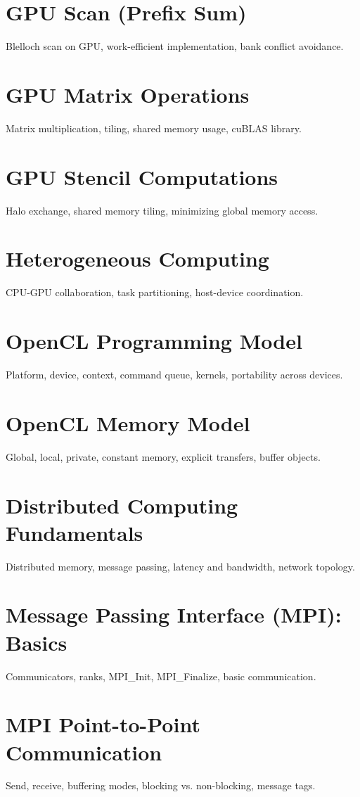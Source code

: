 \chapter{GPU Scan (Prefix Sum)}
Blelloch scan on GPU, work-efficient implementation, bank conflict avoidance.

\chapter{GPU Matrix Operations}
Matrix multiplication, tiling, shared memory usage, cuBLAS library.

\chapter{GPU Stencil Computations}
Halo exchange, shared memory tiling, minimizing global memory access.

\chapter{Heterogeneous Computing}
CPU-GPU collaboration, task partitioning, host-device coordination.

\chapter{OpenCL Programming Model}
Platform, device, context, command queue, kernels, portability across devices.

\chapter{OpenCL Memory Model}
Global, local, private, constant memory, explicit transfers, buffer objects.


\chapter{Distributed Computing Fundamentals}
Distributed memory, message passing, latency and bandwidth, network topology.

\chapter{Message Passing Interface (MPI): Basics}
Communicators, ranks, MPI\_Init, MPI\_Finalize, basic communication.

\chapter{MPI Point-to-Point Communication}
Send, receive, buffering modes, blocking vs. non-blocking, message tags.


